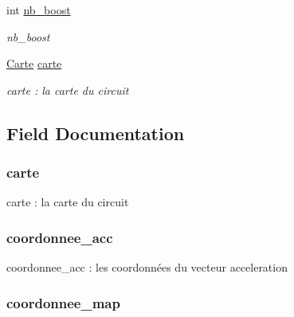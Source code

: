 \begin{DoxyCompactItemize}
int \hyperlink{struct_pilote_ad077cd6faff912e4515c4edc8a3c9581}{nb\-\_\-boost}
\begin{DoxyCompactList}\small\item\em nb\-\_\-boost \end{DoxyCompactList}\item 
\hyperlink{struct_carte}{Carte} \hyperlink{struct_pilote_a9227730fb4bc8833fece7e51e46ff811}{carte}
\begin{DoxyCompactList}\small\item\em carte \-: la carte du circuit \end{DoxyCompactList}\end{DoxyCompactItemize}


\subsection{Field Documentation}
\hypertarget{struct_pilote_a9227730fb4bc8833fece7e51e46ff811}{
\subsubsection[{carte}]{ carte}}\label{struct_pilote_a9227730fb4bc8833fece7e51e46ff811}


carte \-: la carte du circuit 

\hypertarget{struct_pilote_a1411a5d05b90490662441200e1c4e40d}{
\subsubsection[{coordonnee\-\_\-acc}]{ coordonnee\-\_\-acc}}\label{struct_pilote_a1411a5d05b90490662441200e1c4e40d}


coordonnee\-\_\-acc \-: les coordonnées du vecteur acceleration 

\hypertarget{struct_pilote_a52837bcb5b3f3ad927339433eff60951}{
\subsubsection[{coordonnee\-\_\-map}]{ coordonnee\-\_\-map}}\label{struct_pilote_a52837bcb5b3f3ad927339433eff60951}



